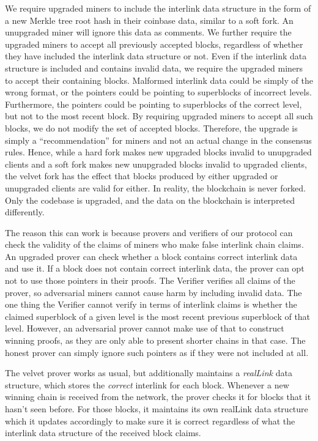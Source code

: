 We require upgraded miners to include the interlink data structure in the form
of a new Merkle tree root hash in their coinbase data, similar to a soft fork.
An unupgraded miner will ignore this data as comments. We further require the
upgraded miners to accept all previously accepted blocks, regardless of whether
they have included the interlink data structure or not. Even if the interlink
data structure is included and contains invalid data, we require the upgraded
miners to accept their containing blocks. Malformed interlink data could be
simply of the wrong format, or the pointers could be pointing to superblocks of
incorrect levels. Furthermore, the pointers could be pointing to superblocks of
the correct level, but not to the most recent block. By requiring upgraded
miners to accept all such blocks, we do not modify the set of accepted blocks.
Therefore, the upgrade is simply a ``recommendation'' for miners and not an
actual change in the consensus rules. Hence, while a hard fork makes new
upgraded blocks invalid to unupgraded clients and a soft fork makes new
unupgraded blocks invalid to upgraded clients, the velvet fork has the effect
that blocks produced by either upgraded or unupgraded clients are valid for
either. In reality, the blockchain is never forked. Only the codebase is
upgraded, and the data on the blockchain is interpreted differently.

The reason this can work is because provers and verifiers of our protocol can
check the validity of the claims of miners who make false interlink chain
claims. An upgraded prover can check whether a block contains correct interlink
data and use it. If a block does not contain correct interlink data, the prover
can opt not to use those pointers in their proofs. The Verifier verifies all
claims of the prover, so adversarial miners cannot cause harm by including
invalid data. The one thing the Verifier cannot verify in terms of interlink
claims is whether the claimed superblock of a given level is the most recent
previous superblock of that level. However, an adversarial prover cannot make
use of that to construct winning proofs, as they are only able to present
shorter chains in that case. The honest prover can simply ignore such pointers
as if they were not included at all.

The velvet prover works as usual, but additionally maintains a \textit{realLink}
data structure, which stores the \textit{correct} interlink for each block.
Whenever a new winning chain is received from the network, the prover checks it
for blocks that it hasn't seen before. For those blocks, it maintains its own
realLink data structure which it updates accordingly to make sure it is correct
regardless of what the interlink data structure of the received block claims.

